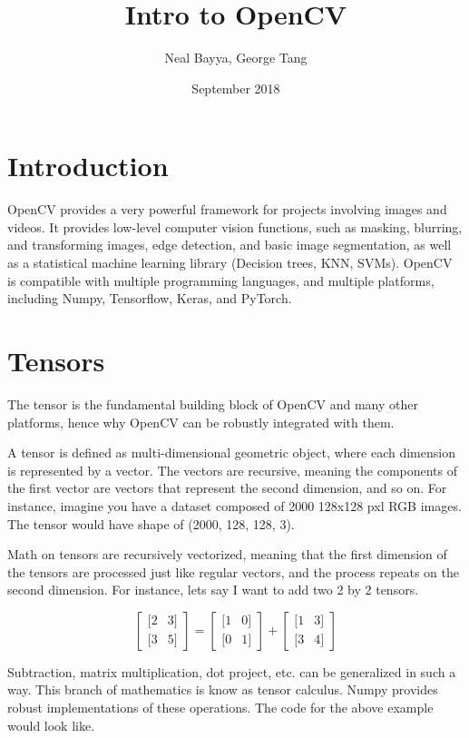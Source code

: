 \documentclass{article}
\title{Intro to OpenCV}
\author{ Neal Bayya, George Tang }
\date{September 2018}
\begin{document}
\maketitle

\section{Introduction}
OpenCV provides a very powerful framework for projects involving images and videos. It provides low-level computer vision functions, such as masking, blurring, and transforming images, edge detection, and basic image segmentation, as well as a statistical machine learning library (Decision trees, KNN, SVMs). OpenCV is compatible with multiple programming languages, and multiple platforms, including Numpy, Tensorflow, Keras, and PyTorch.

\section{Tensors}
The tensor is the fundamental building block of OpenCV and many other platforms, hence why OpenCV can be robustly integrated with them.

A tensor is defined as multi-dimensional geometric object, where each dimension is represented by a vector. The vectors are recursive, meaning the components of the first vector are vectors that represent the second dimension, and so on. For instance, imagine you have a dataset composed of 2000 128x128 pxl RGB images. The tensor would have shape of (2000, 128, 128, 3). 

Math on tensors are recursively vectorized, meaning that the first dimension of the tensors are processed just like regular vectors, and the process repeats on the second dimension. For instance, lets say I want to add two 2 by 2 tensors. 

\[
\begin{bmatrix}
[ 2 & 3 ] \\
[ 3 & 5 ]
\end{bmatrix}
=
\begin{bmatrix}
[ 1 & 0 ]\\
[ 0 & 1 ] 
\end{bmatrix}
+
\begin{bmatrix}
[ 1 & 3 ] \\
[ 3 & 4 ]
\end{bmatrix}
\]

\noindent
Subtraction, matrix multiplication, dot project, etc. can be generalized in such a way. This branch of mathematics is know as tensor calculus. Numpy provides robust implementations of these operations. The code for the above example would look like. 
\end{document}

